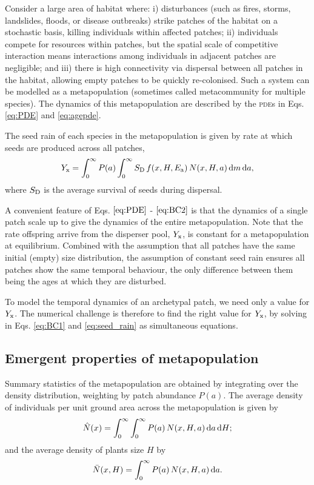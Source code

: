\documentclass[10pt,twoside]{article}
\begin{document}
Consider a large area of habitat where: i) disturbances (such as fires,
storms, landslides, floods, or disease outbreaks) strike patches of the
habitat on a stochastic basis, killing individuals within affected
patches; ii) individuals compete for resources within patches, but the
spatial scale of competitive interaction means interactions among
individuals in adjacent patches are negligible; and iii) there is high
connectivity via dispersal between all patches in the habitat, allowing
empty patches to be quickly re-colonised. Such a system can be modelled
as a metapopulation (sometimes called metacommunity for multiple
species). The dynamics of this metapopulation are described by the
\textsc{pde}s in Eqs. \ref{eq:PDE} and  \ref{eq:agepde}.

The seed rain of each species in the metapopulation is given by rate at
which seeds are produced across all patches,
\begin{equation}  \label{eq:seed_rain}
  Y_{\rm x} = \int_0^{\infty} P(a)  \int_0^{\infty} S_{\rm D} \, f(x, H, E_{\rm a}) \, N(x, H, a) \, {\rm d} m \, {\rm d} a,
\end{equation}
where \(S_{\rm D}\) is the average survival of seeds during dispersal.

A convenient feature of Eqs. \(\ref{eq:PDE}\) - \(\ref{eq:BC2}\) is that
the dynamics of a single patch scale up to give the dynamics of the
entire metapopulation. Note that the rate offspring arrive from the
disperser pool, \(Y_{\rm x}\), is constant for a metapopulation at
equilibrium. Combined with the assumption that all patches have the same
initial (empty) size distribution, the assumption of constant seed rain
ensures all patches show the same temporal behaviour, the only
difference between them being the ages at which they are disturbed.

To model the temporal dynamics of an archetypal patch, we need only a
value for \(Y_{\rm x}\). The numerical challenge is therefore to find the
right value for \(Y_{\rm x}\), by solving in Eqs. \ref{eq:BC1} and
\ref{eq:seed_rain} as simultaneous equations.

\subsection{Emergent properties of
metapopulation}\label{emergent-properties-of-metapopulation}

Summary statistics of the metapopulation are obtained by integrating
over the density distribution, weighting by patch abundance \(P(a)\).
The average density of individuals per unit ground area across the metapopulation is given by
\begin{equation}
  \hat{N}(x) = \int_{0}^{\infty} \int_{0}^{\infty}P(a) \, N(x, H, a) \, {\rm d}a \, {\rm d}H;
\end{equation}
and the average density of plants size \(H\) by
\begin{equation}
  \bar{N}(x, H) = \int_{0}^{\infty}P(a) \, N(x, H, a) \, {\rm d}a.
\end{equation}
\end{document}
